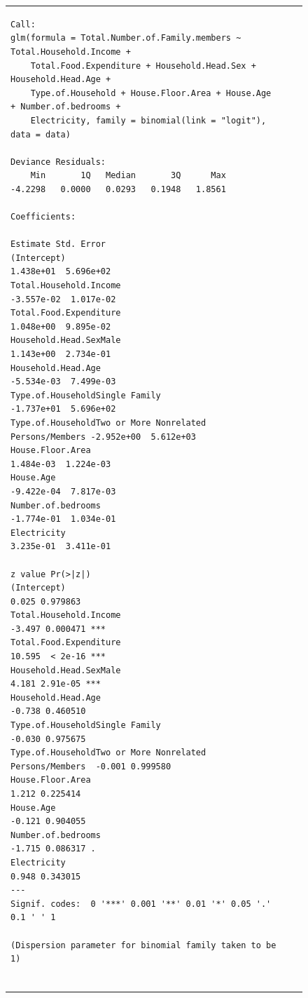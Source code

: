 \documentclass[
]{article}
\begin{document}
\begin{figure}[H]
\begin{table}[H]
\begin{tabular}[t]{lrr}
\begin{verbatim}
Call:
glm(formula = Total.Number.of.Family.members ~ Total.Household.Income + 
    Total.Food.Expenditure + Household.Head.Sex + Household.Head.Age + 
    Type.of.Household + House.Floor.Area + House.Age + Number.of.bedrooms + 
    Electricity, family = binomial(link = "logit"), data = data)

Deviance Residuals: 
    Min       1Q   Median       3Q      Max  
-4.2298   0.0000   0.0293   0.1948   1.8561  

Coefficients:
                                                          Estimate Std. Error
(Intercept)                                              1.438e+01  5.696e+02
Total.Household.Income                                  -3.557e-02  1.017e-02
Total.Food.Expenditure                                   1.048e+00  9.895e-02
Household.Head.SexMale                                   1.143e+00  2.734e-01
Household.Head.Age                                      -5.534e-03  7.499e-03
Type.of.HouseholdSingle Family                          -1.737e+01  5.696e+02
Type.of.HouseholdTwo or More Nonrelated Persons/Members -2.952e+00  5.612e+03
House.Floor.Area                                         1.484e-03  1.224e-03
House.Age                                               -9.422e-04  7.817e-03
Number.of.bedrooms                                      -1.774e-01  1.034e-01
Electricity                                              3.235e-01  3.411e-01
                                                        z value Pr(>|z|)    
(Intercept)                                               0.025 0.979863    
Total.Household.Income                                   -3.497 0.000471 ***
Total.Food.Expenditure                                   10.595  < 2e-16 ***
Household.Head.SexMale                                    4.181 2.91e-05 ***
Household.Head.Age                                       -0.738 0.460510    
Type.of.HouseholdSingle Family                           -0.030 0.975675    
Type.of.HouseholdTwo or More Nonrelated Persons/Members  -0.001 0.999580    
House.Floor.Area                                          1.212 0.225414    
House.Age                                                -0.121 0.904055    
Number.of.bedrooms                                       -1.715 0.086317 .  
Electricity                                               0.948 0.343015    
---
Signif. codes:  0 '***' 0.001 '**' 0.01 '*' 0.05 '.' 0.1 ' ' 1

(Dispersion parameter for binomial family taken to be 1)


\end{verbatim}
\end{tabular}
\end{table}
\end{figure}
\end{document}
